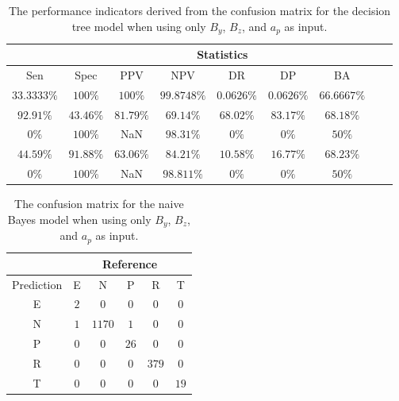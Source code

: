 \begin{table}[!ht]
	\centering
	\begin{tabular}{|c|c|c|c|c|c|c|c|c|}
		\hline
		 & \multicolumn{7}{c|}{Statistics} \\ \hline
		Sen & Spec & PPV & NPV & DR & DP & BA \\ \hline
		$33.3333\%$ & $100\%$ & $100\%$ & $99.8748\%$ & $0.0626\%$ & $0.0626\%$ & $66.6667\%$ \\ \hline
		$92.91\%$ & $43.46\%$ & $81.79\%$ & $69.14\%$ & $68.02\%$ & $83.17\%$ & $68.18\%$ \\ \hline
		$0\%$ & $100\%$ & NaN & $98.31\%$ & $0\%$ & $0\%$ & $50\%$ \\ \hline
		$44.59\%$ & $91.88\%$ & $63.06\%$ & $84.21\%$ & $10.58\%$ & $16.77\%$ & $68.23\%$ \\ \hline
		$0\%$ & $100\%$ & NaN & $98.811\%$ & $0\%$ & $0\%$ & $50\%$ \\ \hline
	\end{tabular}
	\caption{The performance indicators derived from the confusion matrix for the decision tree model when using only $B_{y}$, $B_{z}$, and $a_{p}$ as input.}
	\label{tab:cs:yzap:C5.0}
\end{table}

\begin{table}[!ht]
	\centering
	\begin{tabular}{|c|c|c|c|c|c|}
		\hline
		 & \multicolumn{5}{|c|}{Reference} \\ \hline
		 Prediction & E & N & P & R & T \\ \hline
		 E & $2$ & $0$ & $0$ & $0$ & $0$ \\ \hline
		 N & $1$ & $1170$ & $1$ & $0$ & $0$ \\ \hline
		 P & $0$ & $0$ & $26$ & $0$ & $0$ \\ \hline
		 R & $0$ & $0$ & $0$ & $379$ & $0$ \\ \hline
		 T & $0$ & $0$ & $0$ & $0$ & $19$ \\ \hline
	\end{tabular}
	\caption{The confusion matrix for the naive Bayes model when using only $B_{y}$, $B_{z}$, and $a_{p}$ as input.}
	\label{tab:cm:yzap:nb}
\end{table}

